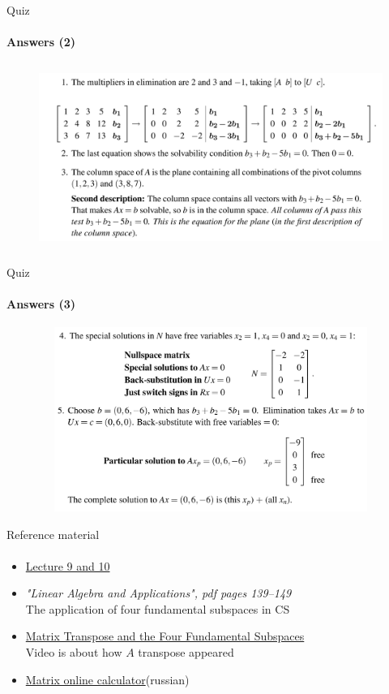 \documentclass[aspectratio=169]{beamer}
\newcommand{\fbckg}[1]{\usebackgroundtemplate{\texttt{[image: \#1]}}}%
\begin{document}
\begin{frame}[t]{Quiz}
    \vspace{-0.35cm}
    \framesubtitle{Answers (2)}
    \begin{figure}[H]
        \centering\includegraphics[height=6cm,width=1\textwidth,keepaspectratio]{quiz21.png}
        \label{fig:quiz21.png}
    \end{figure}
\end{frame}

\begin{frame}[t]{Quiz}
    \framesubtitle{Answers (3)}
    \vspace{-0.35cm}
    \begin{figure}[H]
        \centering\includegraphics[height=6cm,width=1\textwidth,keepaspectratio]{quiz22.png}
        \label{fig:quiz22.png}
    \end{figure}
\end{frame}

\begin{frame}[t]{Reference material}
    \framesubtitle{}
    \Large
    \begin{itemize}
        \item \href{https://www.youtube.com/watch?v=yjBerM5jWsc&list=PL49CF3715CB9EF31D&index=9}{Lecture 9 and 10}
        \item \textit{"Linear Algebra and Applications", pdf pages 139--149 }\\ The application of four fundamental subspaces in CS
        \item \href{https://youtu.be/yfj8uMwAgrI}{Matrix Transpose and the Four Fundamental Subspaces}\\ Video is about how $A$ transpose appeared
        \item \href{https://matworld.ru/calculator/matrix-calculator-1.php}{Matrix online calculator}(russian)
    \end{itemize}
\end{frame}

\usebackgroundtemplate{}


\fbckg{fibeamer/figs/last_page.png}
\frame[plain]{}
\end{document}
